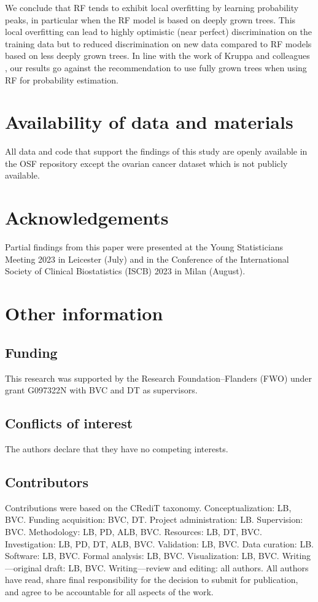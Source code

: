 We conclude that \gls{RF} tends to exhibit local overfitting by learning probability
peaks, in particular when the \gls{RF} model is based on deeply grown trees. This
local overfitting can lead to highly optimistic (near perfect) discrimination on
the training data but to reduced discrimination on new data compared to \gls{RF}
models based on less deeply grown trees. In line with the work of Kruppa and
colleagues \cite{kruppaProbabilityEstimationMachine2014a}, our results go
against the recommendation to use fully grown trees when using \gls{RF} for
probability estimation.

\section*{Availability of data and materials}
All data and code that support the findings of this study are openly available
in the \gls{OSF} repository
 \cite{barrenadaUnderstandingOverfittingRandom2023} except the ovarian cancer
dataset which is not publicly available.

\section*{Acknowledgements}
Partial findings from this paper were presented at the Young Statisticians
Meeting 2023 in Leicester (July) and in the Conference of the International
Society of Clinical Biostatistics (ISCB) 2023 in Milan (August).

\section*{Other information}
\subsection*{Funding}
This research was supported by the Research Foundation--Flanders (FWO) under
grant G097322N with BVC and DT as supervisors.

\subsection*{Conflicts of interest}
The authors declare that they have no competing interests.

\subsection*{Contributors}
Contributions were based on the CRediT taxonomy. Conceptualization: LB, BVC.
Funding acquisition: BVC, DT. Project administration: LB. Supervision: BVC.
Methodology: LB, PD, ALB, BVC. Resources: LB, DT, BVC. Investigation: LB, PD,
DT, ALB, BVC. Validation: LB, BVC. Data curation: LB. Software: LB, BVC.
Formal analysis: LB, BVC. Visualization: LB, BVC. Writing---original draft: LB,
BVC. Writing---review and editing: all authors. All authors have read, share
final responsibility for the decision to submit for publication, and agree to be
accountable for all aspects of the work.
